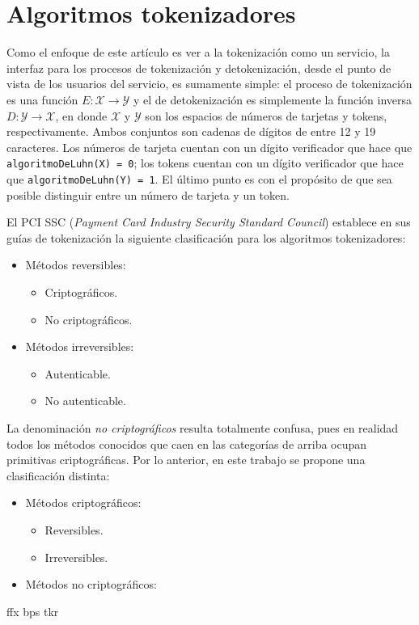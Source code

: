%
%

\section{Algoritmos tokenizadores}

Como el enfoque de este artículo es ver a la tokenización como un servicio, la
interfaz para los procesos de tokenización y detokenización, desde el punto de
vista de los usuarios del servicio, es sumamente simple: el proceso de
tokenización es una función $ E: \mathcal{X} \rightarrow \mathcal{Y} $ y el de
detokenización es  simplemente la función inversa $ D: \mathcal{Y} \rightarrow
\mathcal{X} $, en donde $ \mathcal{X} $ y $ \mathcal{Y} $ son los espacios de
números de tarjetas y tokens, respectivamente. Ambos conjuntos son cadenas de
dígitos de entre 12 y 19 caracteres. Los números de tarjeta cuentan con un
dígito verificador que hace que \texttt{algoritmoDeLuhn(X) = 0}; los tokens
cuentan con un dígito verificador que hace que \texttt{algoritmoDeLuhn(Y) = 1}.
El último punto es con el propósito de que sea posible distinguir entre un
número de tarjeta y un token.

El PCI SSC (\textit{Payment Card Industry Security Standard Council}) establece
en sus guías de tokenización la siguiente clasificación para los algoritmos
tokenizadores\cite{pci_tokens}:


\begin{itemize}
  \item Métodos reversibles:
  \begin{itemize}
    \item Criptográficos.
    \item No criptográficos.
  \end{itemize}
  \item Métodos irreversibles:
  \begin{itemize}
    \item Autenticable.
    \item No autenticable.
  \end{itemize}
\end{itemize}

La denominación \textit{no criptográficos} resulta totalmente confusa, pues en
realidad todos los métodos conocidos que caen en las categorías de arriba ocupan
primitivas criptográficas. %
Por lo anterior, en este trabajo se propone una clasificación distinta:


\begin{itemize}
  \item Métodos criptográficos:
  \begin{itemize}
    \item Reversibles.
    \item Irreversibles.
  \end{itemize}
  \item Métodos no criptográficos:
\end{itemize}

{ffx}
{bps}
{tkr}
